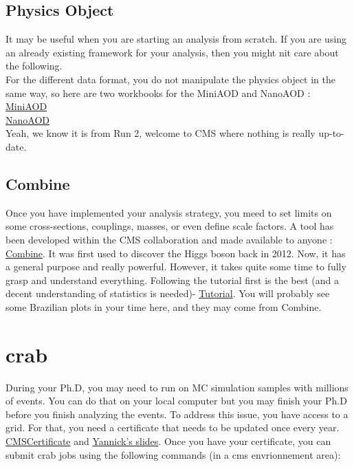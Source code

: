 \documentclass[reprint, a4paper, nofootinbib, amsmath, amssymb, aps]{revtex4-1}
\begin{document}
\subsection{Physics Object}
    It may be useful when you are starting an analysis from scratch. If you are using an already existing framework for your analysis, then you might nit care about the following. \\
    For the different data format, you do not manipulate the physics object in the same way, so here are two workbooks for the MiniAOD and NanoAOD : \\
    \href{https://twiki.cern.ch/twiki/bin/view/CMSPublic/WorkBookMiniAOD2017}{MiniAOD}\\
    \href{https://twiki.cern.ch/twiki/bin/view/CMSPublic/WorkBookNanoAOD}{NanoAOD}\\
    Yeah, we know it is from Run 2, welcome to CMS where nothing is really up-to-date.



\subsection{Combine}


    Once you have implemented your analysis strategy, you meed to set limits on some cross-sections, couplings, masses, or even define scale factors. A tool has been developed within the CMS collaboration and made available to anyone : \href{https://cms-analysis.github.io/HiggsAnalysis-CombinedLimit/latest/}{Combine}. It was first used to discover the Higgs boson back in 2012. Now, it  has a general purpose and really powerful. However, it takes quite some time to fully grasp and understand everything. Following the tutorial first is the best (and a decent understanding of statistics is needed)- \href{https://cms-analysis.github.io/HiggsAnalysis-CombinedLimit/latest/part5/longexercise/}{Tutorial}. You will probably see some Brazilian plots in your time here, and they may come from Combine.

\section{crab}

 During your Ph.D, you may need to run on MC simulation samples with millions of events. You can do that on your local computer but you may finish your Ph.D  before you finish analyzing the events. To address this issue, you have access to a grid. For that, you need a certificate that needs to be updated once every year. \href{https://twiki.cern.ch/twiki/bin/view/CMSPublic/WorkBookChapter5}{CMSCertificate} and \href{https://indico.in2p3.fr/event/32895/}{Yannick's slides}. Once you have your certificate, you can submit crab jobs using the following commands (in a cms envrionnement area): 
 
\end{document}
